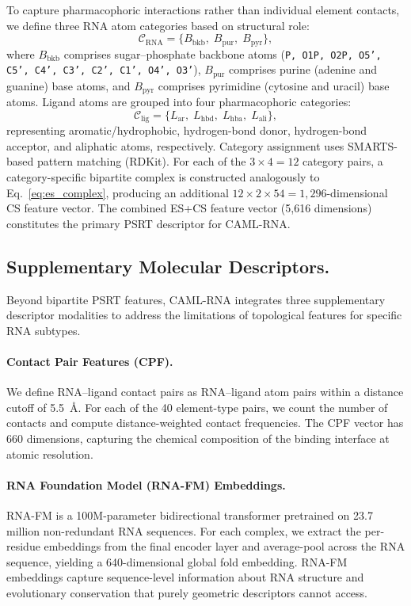 \documentclass[10pt,twocolumn]{article}
\begin{document}
To capture pharmacophoric interactions rather than individual element contacts,
we define three RNA atom categories based on structural role:
\begin{equation}
\mathcal{C}_{\mathrm{RNA}} = \{B_{\mathrm{bkb}},\; B_{\mathrm{pur}},\; B_{\mathrm{pyr}}\},
\label{eq:rna_cats}
\end{equation}
where $B_{\mathrm{bkb}}$ comprises sugar--phosphate backbone atoms
(\texttt{P, O1P, O2P, O5', C5', C4', C3', C2', C1', O4', O3'}),
$B_{\mathrm{pur}}$ comprises purine (adenine and guanine) base atoms,
and $B_{\mathrm{pyr}}$ comprises pyrimidine (cytosine and uracil) base atoms.
Ligand atoms are grouped into four pharmacophoric categories:
\begin{equation}
\mathcal{C}_{\mathrm{lig}} = \{L_{\mathrm{ar}},\; L_{\mathrm{hbd}},\; L_{\mathrm{hba}},\; L_{\mathrm{ali}}\},
\label{eq:lig_cats}
\end{equation}
representing aromatic/hydrophobic, hydrogen-bond donor, hydrogen-bond acceptor,
and aliphatic atoms, respectively.
Category assignment uses SMARTS-based pattern matching (RDKit).
For each of the $3 \times 4 = 12$ category pairs,
a category-specific bipartite complex is constructed analogously to
Eq.~\eqref{eq:es_complex}, producing an additional $12 \times 2 \times 54 = 1{,}296$-dimensional
CS feature vector.
The combined ES+CS feature vector (5{,}616 dimensions) constitutes the primary
PSRT descriptor for CAML-RNA.


\subsection{Supplementary Molecular Descriptors.}

Beyond bipartite PSRT features, CAML-RNA integrates three supplementary
descriptor modalities to address the limitations of topological features
for specific RNA subtypes.

\paragraph{Contact Pair Features (CPF).}
We define RNA--ligand contact pairs as RNA--ligand atom pairs within
a distance cutoff of 5.5~\AA.
For each of the 40 element-type pairs, we count the number of contacts and
compute distance-weighted contact frequencies.
The CPF vector has 660 dimensions, capturing the chemical composition
of the binding interface at atomic resolution.

\paragraph{RNA Foundation Model (RNA-FM) Embeddings.}
RNA-FM\cite{Chen2022RNAFM} is a 100M-parameter bidirectional transformer
pretrained on 23.7 million non-redundant RNA sequences.
For each complex, we extract the per-residue embeddings from the final encoder
layer and average-pool across the RNA sequence, yielding a 640-dimensional
global fold embedding.
RNA-FM embeddings capture sequence-level information about RNA structure and
evolutionary conservation that purely geometric descriptors cannot access.
\end{document}
